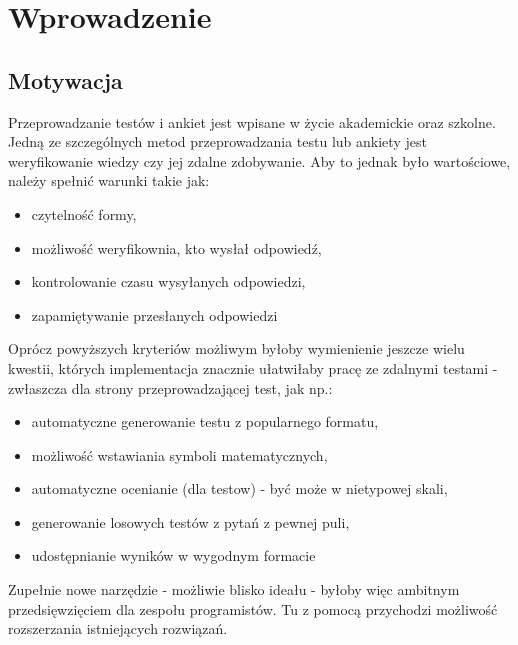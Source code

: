 \chapter{Wprowadzenie}%
\section{Motywacja}
Przeprowadzanie testów i ankiet jest wpisane w życie akademickie oraz szkolne. Jedną ze szczególnych metod przeprowadzania testu lub ankiety jest weryfikowanie wiedzy czy jej zdalne zdobywanie.
Aby to jednak było wartościowe, należy spełnić warunki takie jak:
\begin{itemize}
\item czytelność formy,
\item możliwość weryfikownia, kto wysłał odpowiedź,
\item kontrolowanie czasu wysyłanych odpowiedzi,
\item zapamiętywanie przesłanych odpowiedzi
\end{itemize}
Oprócz powyższych kryteriów możliwym byłoby wymienienie jeszcze wielu kwestii, których implementacja znacznie ułatwiłaby pracę ze zdalnymi testami - zwłaszcza dla strony przeprowadzającej test, jak np.:
\begin{itemize}
\item automatyczne generowanie testu z popularnego formatu,
\item możliwość wstawiania symboli matematycznych,
\item automatyczne ocenianie (dla testow)  - być może w nietypowej skali,
\item generowanie losowych testów z pytań z pewnej puli,
\item udostępnianie wyników w wygodnym formacie
\end{itemize}
Zupełnie nowe narzędzie - możliwie blisko ideału - byłoby więc ambitnym przedsięwzięciem dla zespołu programistów. Tu z pomocą przychodzi możliwość rozszerzania istniejących rozwiązań.

